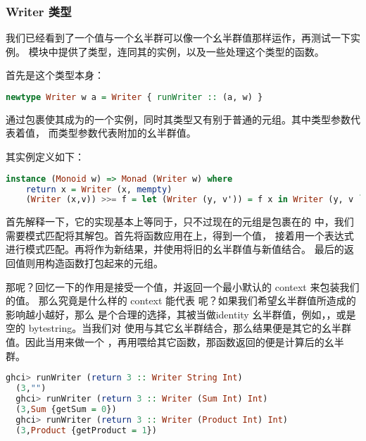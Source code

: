 \documentclass[./main.tex]{subfiles}
\begin{document}
\subsubsection*{Writer 类型}

我们已经看到了一个值与一个幺半群可以像一个幺半群值那样运作，再测试一下实例。
模块中提供了类型，连同其的实例，以及一些处理这个类型的函数。

首先是这个类型本身：

\begin{lstlisting}[language=Haskell]
  newtype Writer w a = Writer { runWriter :: (a, w) }
\end{lstlisting}

通过包裹使其成为的一个实例，同时其类型又有别于普通的元组。其中类型参数代表着值，
而类型参数代表附加的幺半群值。

其实例定义如下：

\begin{lstlisting}[language=Haskell]
  instance (Monoid w) => Monad (Writer w) where
    return x = Writer (x, mempty)
    (Writer (x,v)) >>= f = let (Writer (y, v')) = f x in Writer (y, v `mappend` v')
\end{lstlisting}

首先解释一下\acode{>>=}，它的实现基本上等同于，只不过现在的元组是包裹在的
中，我们需要模式匹配将其解包。首先将函数应用在上，得到一个值，
接着用一个表达式进行模式匹配。再将作为新结果，并使用将旧的幺半群值与新值结合。
最后的返回值则用构造函数打包起来的元组。

那呢？回忆一下的作用是接受一个值，并返回一个最小默认的 context 来包装我们的值。
那么究竟是什么样的 context 能代表  呢？如果我们希望幺半群值所造成的影响越小越好，那么
是个合理的选择，其被当做identity 幺半群值，例如，，或是空的 bytestring。当我们对
使用与其它幺半群结合，那么结果便是其它的幺半群值。因此当用来做一个
，再用\acode{>>=}喂给其它函数，那函数返回的便是计算后的幺半群。

\begin{lstlisting}[language=Haskell]
  ghci> runWriter (return 3 :: Writer String Int)
  (3,"")
  ghci> runWriter (return 3 :: Writer (Sum Int) Int)
  (3,Sum {getSum = 0})
  ghci> runWriter (return 3 :: Writer (Product Int) Int)
  (3,Product {getProduct = 1})
\end{lstlisting}
\end{document}
